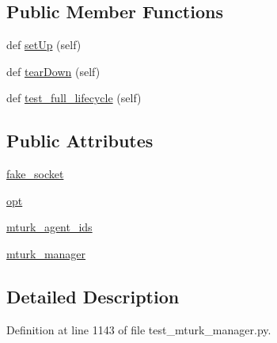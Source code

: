 \subsection*{Public Member Functions}
\begin{DoxyCompactItemize}
\item 
def \hyperlink{classparlai_1_1mturk_1_1core_1_1legacy__2018_1_1test_1_1test__mturk__manager_1_1TestMTurkManagerLifecycleFunctions_ae594591f10f5d6f0ae5f01cd44adac97}{set\+Up} (self)
\item 
def \hyperlink{classparlai_1_1mturk_1_1core_1_1legacy__2018_1_1test_1_1test__mturk__manager_1_1TestMTurkManagerLifecycleFunctions_a12fb26102e0071525ce6f91e9059c72c}{tear\+Down} (self)
\item 
def \hyperlink{classparlai_1_1mturk_1_1core_1_1legacy__2018_1_1test_1_1test__mturk__manager_1_1TestMTurkManagerLifecycleFunctions_a432f7aa1cf39443f240ed3024ddfbc56}{test\+\_\+full\+\_\+lifecycle} (self)
\end{DoxyCompactItemize}
\subsection*{Public Attributes}
\begin{DoxyCompactItemize}
\item 
\hyperlink{classparlai_1_1mturk_1_1core_1_1legacy__2018_1_1test_1_1test__mturk__manager_1_1TestMTurkManagerLifecycleFunctions_ae493ff13abfcd39062b9f59646f2cc78}{fake\+\_\+socket}
\item 
\hyperlink{classparlai_1_1mturk_1_1core_1_1legacy__2018_1_1test_1_1test__mturk__manager_1_1TestMTurkManagerLifecycleFunctions_a39afd108df54a9d9b171632344a0a932}{opt}
\item 
\hyperlink{classparlai_1_1mturk_1_1core_1_1legacy__2018_1_1test_1_1test__mturk__manager_1_1TestMTurkManagerLifecycleFunctions_a660878f2fba9edb9380818f7d9a73f8b}{mturk\+\_\+agent\+\_\+ids}
\item 
\hyperlink{classparlai_1_1mturk_1_1core_1_1legacy__2018_1_1test_1_1test__mturk__manager_1_1TestMTurkManagerLifecycleFunctions_a29deb14a49333ddae88f7efe1f6a1f2d}{mturk\+\_\+manager}
\end{DoxyCompactItemize}


\subsection{Detailed Description}


Definition at line 1143 of file test\+\_\+mturk\+\_\+manager.\+py.



